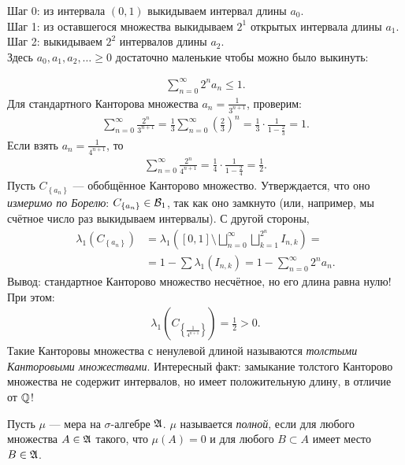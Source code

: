 \begin{exmpl}
\begin{enumerate}
	  Шаг 0: из интервала $(0, 1)$ выкидываем интервал длины $a_0$. \\
	  Шаг 1: из оставшегося множества выкидываем $2^{1}$ открытых интервала длины $a_1$. \\
	  Шаг 2: выкидываем $2^{2}$ интервалов длины $a_2$. \\
	  Здесь $a_0, a_1, a_2, \ldots \geqslant 0$ достаточно маленькие чтобы можно было выкинуть:
	  
\begin{align*}
    \sum_{n=0}^{\infty} 2^{n} a_n \leqslant 1
   .\end{align*} Для стандартного Канторова множества $a_n = \frac{1}{3^{n+1}}$, проверим:
   \begin{align*}
    \sum_{n=0}^{\infty} \frac{2^{n}}{3^{n+1}} = \frac{1}{3} \sum_{n=0}^{\infty} \left( \frac{2}{3} \right)^{n} = \frac{1}{3} \cdot \frac{1}{1 - \frac{2}{3}} = 1
   .\end{align*} Если взять $a_n = \frac{1}{4^{n+1}}$, то
   \begin{align*}
    \sum_{n=0}^{\infty} \frac{2^{n}}{4^{n+1}} = \frac{1}{4} \cdot \frac{1}{1 - \frac{2}{4}} = \frac{1}{2}
   .\end{align*} Пусть $C_{\left\{ a_n \right\}}$ --- обобщённое Канторово множество. Утверждается, что оно \textit{измеримо по Борелю}: $C_{\left\{ a_n \right\}} \in \mathcal{B}_1$, так как оно замкнуто (или, например, мы счётное число раз выкидываем интервалы). С другой стороны,
   \begin{align*}
    \lambda_1 \left( C_{\left\{ a_n \right\}} \right)
    & = \lambda_{1} \left( [0, 1] \setminus \bigsqcup_{n=0}^{\infty} \bigsqcup_{k=1}^{2^{n}} I_{n,k} \right) = \\
    & =  1 - \sum  \lambda_1(I_{n,k}) = 1 - \sum_{n=0}^{\infty} 2^{n} a_n
   .\end{align*} Вывод: стандартное Канторово множество несчётное, но его длина равна нулю! При этом:
   \begin{align*}
    \lambda_1 \left( C_{\left\{ \frac{1}{4^{n+1}} \right\}} \right) = \frac{1}{2} > 0
   .\end{align*} Такие Канторовы множества с ненулевой длиной называются \textit{толстыми Канторовыми множествами}. Интересный факт: замыкание толстого Канторово множества не содержит интервалов, но имеет положительную длину, в отличие от $\mathbb{Q}$!
 \end{enumerate}
\end{exmpl}
\begin{df}
 Пусть  $\mu$ --- мера на $\sigma$-алгебре $\mathfrak{A}$. $\mu$ называется \textit{полной}, если для любого множества $A \in \mathfrak{A}$ такого, что $\mu(A) = 0$ и для любого  $B \subset A$ имеет место $B \in \mathfrak{A}$.
\end{df}
